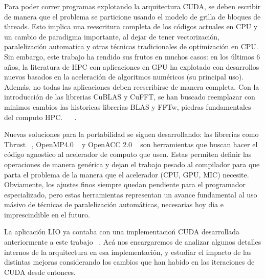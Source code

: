 Para poder correr programas explotando la arquitectura CUDA, se deben escribir de manera que
el problema se particione usando el modelo de grilla de bloques de threads. Esto implica una
reescritura completa de los c\'odigos actuales en CPU y un cambio de paradigma importante, al
dejar de tener vectorizaci\'on, paralelizaci\'on automatica y otras t\'ecnicas tradicionales
de optimizaci\'on en CPU. Sin embargo, este trabajo ha rendido sus frutos en muchos casos:
en los \'ultimos 6 a\~nos, la literatura de HPC con aplicaciones en GPU ha explotado con
desarrollos nuevos basados en la aceleraci\'on de algoritmos num\'ericos (su principal uso).
Adem\'as, no todas las aplicaciones deben reescribirse de manera completa. Con la introducci\'on
de las librerias CuBLAS y CuFFT, se han buscado reemplazar con minimos cambios las historicas
librerias BLAS y FFTw, piedras fundamentales del computo HPC. ~\cite{cublas} ~\cite{cufft}.

Nuevas soluciones para la portabilidad se siguen desarrollando: las librerias como Thrust ~\cite{thrust},
OpenMP4.0 ~\cite{OpenMPspec} y OpenACC 2.0 ~\cite{OpenACCSpec} son herramientas que buscan hacer el
c\'odigo agnostico al acelerador de computo que usen. Estas permiten definir las operaciones de
manera gen\'erica y dejan el trabajo pesado al compilador para que parta el problema de la manera
que el acelerador (CPU, GPU, MIC) necesite. Obviamente, los ajustes finos siempre quedan pendiente para
el programador especializado, pero estas herramientas representan un avance fundamental al uso
m\'asivo de t\'ecnicas de paralelizaci\'on autom\'aticas, necesarias hoy dia e imprescindible en el
futuro.

La aplicaci\'on LIO ya contaba con una implementacio\'n CUDA desarrollada anteriormente a este
trabajo ~\cite{TesisNitsche}. Ac\'a nos encargaremos de analizar algunos detalles internos de
la arquitectura en esa implementaci\'on, y estudiar el impacto de las distintas mejoras considerando
los cambios que han habido en las iteraciones de CUDA desde entonces.
